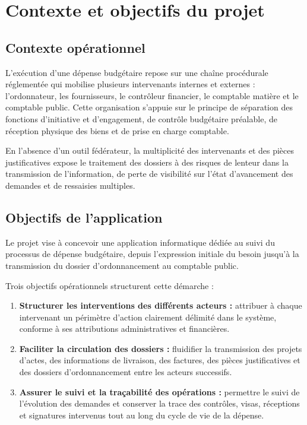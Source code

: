 \section{Contexte et objectifs du projet}

\subsection{Contexte opérationnel}

L'exécution d'une dépense budgétaire repose sur une chaîne procédurale réglementée qui mobilise plusieurs intervenants internes et externes : l'ordonnateur, les fournisseurs, le contrôleur financier, le comptable matière et le comptable public. Cette organisation s'appuie sur le principe de séparation des fonctions d'initiative et d'engagement, de contrôle budgétaire préalable, de réception physique des biens et de prise en charge comptable.

En l'absence d'un outil fédérateur, la multiplicité des intervenants et des pièces justificatives expose le traitement des dossiers à des risques de lenteur dans la transmission de l'information, de perte de visibilité sur l'état d'avancement des demandes et de ressaisies multiples.

\subsection{Objectifs de l'application}

Le projet vise à concevoir une application informatique dédiée au suivi du processus de dépense budgétaire, depuis l'expression initiale du besoin jusqu'à la transmission du dossier d'ordonnancement au comptable public.

Trois objectifs opérationnels structurent cette démarche :

\begin{enumerate}
  \item \textbf{Structurer les interventions des différents acteurs :} attribuer à chaque intervenant un périmètre d'action clairement délimité dans le système, conforme à ses attributions administratives et financières.
  \item \textbf{Faciliter la circulation des dossiers :} fluidifier la transmission des projets d'actes, des informations de livraison, des factures, des pièces justificatives et des dossiers d'ordonnancement entre les acteurs successifs.
  \item \textbf{Assurer le suivi et la traçabilité des opérations :} permettre le suivi de l'évolution des demandes et conserver la trace des contrôles, visas, réceptions et signatures intervenus tout au long du cycle de vie de la dépense.
\end{enumerate}

